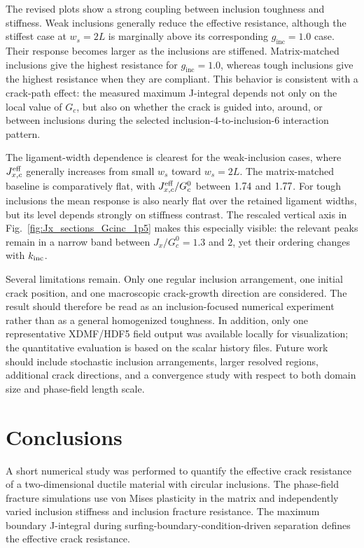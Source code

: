 \documentclass[pdflatex,sn-mathphys-num]{sn-jnl}
\newcommand{\Kinc}{k_{\rm inc}}
\newcommand{\Ginc}{g_{\text{inc}}}
\newcommand{\GcZero}{G_c^0}
\newcommand{\Jeff}{J_{x,c}^{\rm eff}}
\begin{document}
The revised plots show a strong coupling between inclusion toughness and stiffness. Weak inclusions generally reduce the effective resistance, although the stiffest case at \(w_s=2L\) is marginally above its corresponding \(\Ginc=1.0\) case. Their response becomes larger as the inclusions are stiffened. Matrix-matched inclusions give the highest resistance for \(\Ginc=1.0\), whereas tough inclusions give the highest resistance when they are compliant. This behavior is consistent with a crack-path effect: the measured maximum J-integral depends not only on the local value of \(G_c\), but also on whether the crack is guided into, around, or between inclusions during the selected inclusion-4-to-inclusion-6 interaction pattern.

The ligament-width dependence is clearest for the weak-inclusion cases, where \(\Jeff\) generally increases from small \(w_s\) toward \(w_s=2L\). The matrix-matched baseline is comparatively flat, with \(\Jeff/\GcZero\) between \(1.74\) and \(1.77\). For tough inclusions the mean response is also nearly flat over the retained ligament widths, but its level depends strongly on stiffness contrast. The rescaled vertical axis in Fig.~\ref{fig:Jx_sections_Gcinc_1p5} makes this especially visible: the relevant peaks remain in a narrow band between \(J_x/\GcZero=1.3\) and \(2\), yet their ordering changes with \(\Kinc\).

Several limitations remain. Only one regular inclusion arrangement, one initial crack position, and one macroscopic crack-growth direction are considered. The result should therefore be read as an inclusion-focused numerical experiment rather than as a general homogenized toughness. In addition, only one representative XDMF/HDF5 field output was available locally for visualization; the quantitative evaluation is based on the scalar history files. Future work should include stochastic inclusion arrangements, larger resolved regions, additional crack directions, and a convergence study with respect to both domain size and phase-field length scale.

\section{Conclusions}\label{sec:conclusions}

A short numerical study was performed to quantify the effective crack resistance of a two-dimensional ductile material with circular inclusions. The phase-field fracture simulations use von Mises plasticity in the matrix and independently varied inclusion stiffness and inclusion fracture resistance. The maximum boundary J-integral during surfing-boundary-condition-driven separation defines the effective crack resistance.
\end{document}
